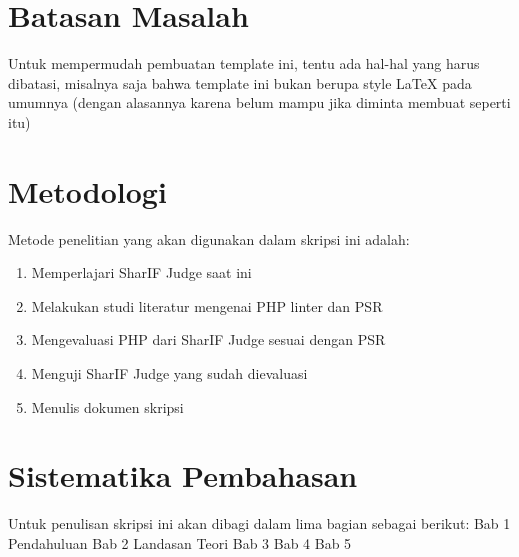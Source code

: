 
\section{Batasan Masalah}
\label{sec:batasan}
Untuk mempermudah pembuatan template ini, tentu ada hal-hal yang harus dibatasi, misalnya saja bahwa template ini bukan berupa style \LaTeX{} pada umumnya (dengan alasannya karena belum mampu jika diminta membuat seperti itu)


\section{Metodologi}
\label{sec:metlit}
Metode penelitian yang akan digunakan dalam skripsi ini adalah:
\begin{enumerate}
	\item Memperlajari SharIF Judge saat ini
	\item Melakukan studi literatur mengenai PHP linter dan PSR
	\item Mengevaluasi PHP dari SharIF Judge sesuai dengan PSR
	\item Menguji SharIF Judge yang sudah dievaluasi
	\item Menulis dokumen skripsi
\end{enumerate}


\section{Sistematika Pembahasan}
\label{sec:sispem}
Untuk penulisan skripsi ini akan dibagi dalam lima bagian sebagai berikut:
Bab 1 Pendahuluan
Bab 2 Landasan Teori 
Bab 3 
Bab 4 
Bab 5 
